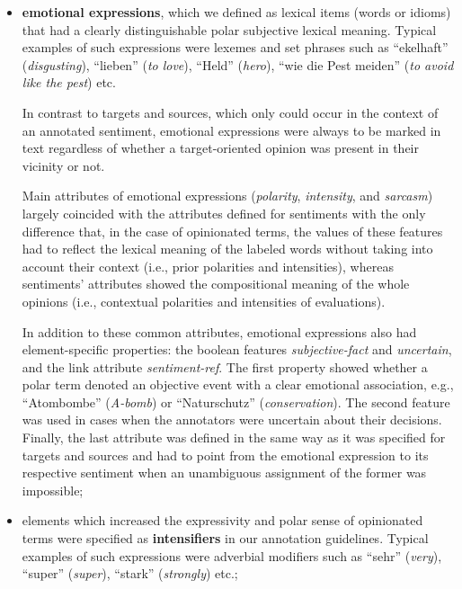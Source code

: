 \begin{itemize}
\item
  \textbf{emotional expressions}, which we defined as lexical items
  (words or idioms) that had a clearly distinguishable polar
  subjective lexical meaning.  Typical examples of such expressions
  were lexemes and set phrases such as ``ekelhaft''
  (\emph{disgusting}), ``lieben'' (\emph{to love}), ``Held''
  (\emph{hero}), ``wie die Pest meiden'' (\emph{to avoid like the
    pest}) etc.

  In contrast to targets and sources, which only could occur in the
  context of an annotated sentiment, emotional expressions were always
  to be marked in text regardless of whether a target-oriented opinion
  was present in their vicinity or not.

  Main attributes of emotional expressions (\emph{polarity},
  \emph{intensity}, and \emph{sarcasm}) largely coincided with the
  attributes defined for sentiments with the only difference that, in
  the case of opinionated terms, the values of these features had to
  reflect the lexical meaning of the labeled words without taking into
  account their context (i.e., prior polarities and intensities),
  whereas sentiments' attributes showed the compositional meaning of
  the whole opinions (i.e., contextual polarities and intensities of
  evaluations).

  In addition to these common attributes, emotional expressions also
  had element-specific properties: the boolean features
  \emph{subjective-fact} and \emph{uncertain}, and the link attribute
  \emph{sentiment-ref}.  The first property showed whether a polar
  term denoted an objective event with a clear emotional association,
  e.g., ``Atombombe'' (\emph{A-bomb}) or ``Naturschutz''
  (\emph{conservation}).  The second feature was used in cases when
  the annotators were uncertain about their decisions.  Finally, the
  last attribute was defined in the same way as it was specified for
  targets and sources and had to point from the emotional expression
  to its respective sentiment when an unambiguous assignment of the
  former was impossible;

\item
  elements which increased the expressivity and polar sense of
  opinionated terms were specified as \textbf{intensifiers} in our
  annotation guidelines.  Typical examples of such expressions were
  adverbial modifiers such as ``sehr'' (\emph{very}), ``super''
  (\emph{super}), ``stark'' (\emph{strongly}) etc.;


\end{itemize}
